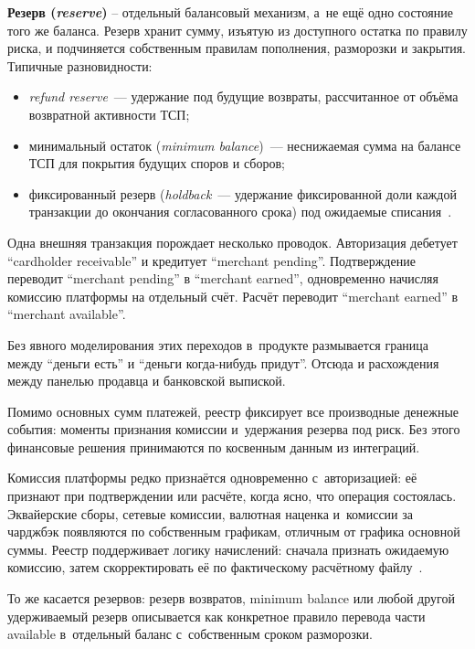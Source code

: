 \textbf{Резерв (\textit{reserve})} -- отдельный балансовый механизм,
а~не ещё одно состояние того же баланса. Резерв хранит сумму,
изъятую из доступного остатка по правилу риска, и подчиняется
собственным правилам пополнения, разморозки и закрытия. Типичные
разновидности:
\begin{itemize}
  \item \textit{refund reserve}~--- удержание под будущие возвраты,
    рассчитанное от объёма возвратной активности ТСП;
  \item минимальный остаток (\textit{minimum balance})~--- неснижаемая
    сумма на балансе ТСП для покрытия будущих споров и сборов;
  \item фиксированный резерв (\textit{holdback}~--- удержание
    фиксированной доли каждой транзакции до окончания согласованного
    срока) под ожидаемые
    списания~\cite{stripe-balances,stripe-minimum-balances,adyen-balances}.
\end{itemize}

Одна внешняя транзакция порождает несколько проводок. Авторизация
дебетует \enquote{cardholder receivable} и кредитует
\enquote{merchant pending}. Подтверждение переводит \enquote{merchant
pending} в \enquote{merchant earned}, одновременно начисляя комиссию
платформы на отдельный счёт. Расчёт переводит \enquote{merchant
earned} в \enquote{merchant available}.

Без явного моделирования этих переходов в~продукте размывается граница между
\enquote{деньги есть} и \enquote{деньги когда-нибудь придут}.
Отсюда и расхождения между панелью продавца и банковской выпиской.

Помимо основных сумм платежей, реестр фиксирует все производные
денежные события: моменты признания комиссии и~удержания резерва под риск.
Без этого финансовые решения принимаются по косвенным данным из интеграций.

Комиссия платформы редко признаётся одновременно с~авторизацией:
её признают при подтверждении или расчёте, когда ясно, что операция
состоялась. Эквайерские сборы, сетевые комиссии, валютная наценка
и~комиссии за чарджбэк появляются по собственным графикам, отличным
от графика основной суммы. Реестр поддерживает логику начислений:
сначала признать ожидаемую комиссию, затем скорректировать её
по фактическому расчётному файлу~\cite{visa-core-rules,mc-tpr,stripe-balances}.

То же касается резервов: резерв возвратов, minimum balance
или любой другой удерживаемый резерв описывается как конкретное
правило перевода части available в~отдельный баланс
с~собственным сроком разморозки.

